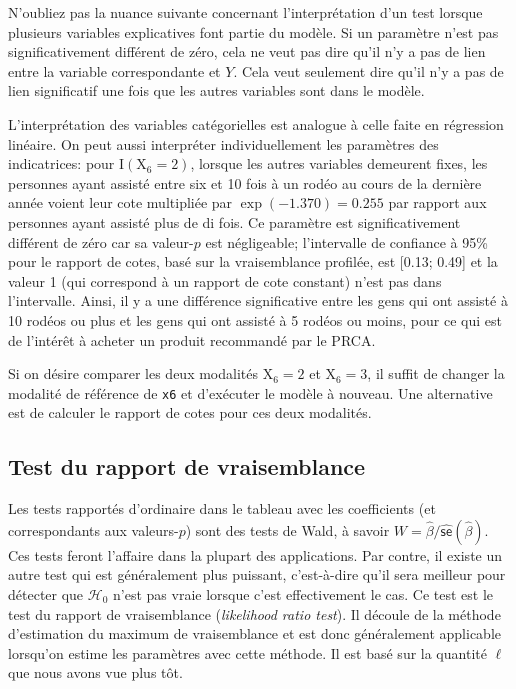 \documentclass[
  11pt,
  letterpaper,
]{book}
\theoremstyle{definition}
\theoremstyle{remark}
\begin{document}
N'oubliez pas la nuance suivante concernant l'interprétation d'un test
lorsque plusieurs variables explicatives font partie du modèle. Si un
paramètre n'est pas significativement différent de zéro, cela ne veut
pas dire qu'il n'y a pas de lien entre la variable correspondante et
\(Y\). Cela veut seulement dire qu'il n'y a pas de lien significatif une
fois que les autres variables sont dans le modèle.

L'interprétation des variables catégorielles est analogue à celle faite
en régression linéaire. On peut aussi interpréter individuellement les
paramètres des indicatrices: pour \(\mathrm{I}(\mathrm{X}_6=2)\),
lorsque les autres variables demeurent fixes, les personnes ayant
assisté entre six et 10 fois à un rodéo au cours de la dernière année
voient leur cote multipliée par \(\exp(-1.370)=0.255\) par rapport aux
personnes ayant assisté plus de di fois. Ce paramètre est
significativement différent de zéro car sa valeur-\(p\) est négligeable;
l'intervalle de confiance à 95\% pour le rapport de cotes, basé sur la
vraisemblance profilée, est {[}0.13; 0.49{]} et la valeur 1 (qui
correspond à un rapport de cote constant) n'est pas dans l'intervalle.
Ainsi, il y a une différence significative entre les gens qui ont
assisté à 10 rodéos ou plus et les gens qui ont assisté à 5 rodéos ou
moins, pour ce qui est de l'intérêt à acheter un produit recommandé par
le PRCA.

Si on désire comparer les deux modalités \(\mathrm{X}_6=2\) et
\(\mathrm{X}_6=3\), il suffit de changer la modalité de référence de
\texttt{x6} et d'exécuter le modèle à nouveau. Une alternative est de
calculer le rapport de cotes pour ces deux modalités.

\hypertarget{test-du-rapport-de-vraisemblance}{%
\subsection{Test du rapport de
vraisemblance}\label{test-du-rapport-de-vraisemblance}}

Les tests rapportés d'ordinaire dans le tableau avec les coefficients
(et correspondants aux valeurs-\(p\)) sont des tests de Wald, à savoir
\(W = \widehat{\beta}/\widehat{\mathsf{se}}(\widehat{\beta})\). Ces
tests feront l'affaire dans la plupart des applications. Par contre, il
existe un autre test qui est généralement plus puissant, c'est-à-dire
qu'il sera meilleur pour détecter que \(\mathscr{H}_0\) n'est pas vraie
lorsque c'est effectivement le cas. Ce test est le test du rapport de
vraisemblance (\emph{likelihood ratio test}). Il découle de la méthode
d'estimation du maximum de vraisemblance et est donc généralement
applicable lorsqu'on estime les paramètres avec cette méthode. Il est
basé sur la quantité \(\ell\) que nous avons vue plus tôt.
\end{document}
